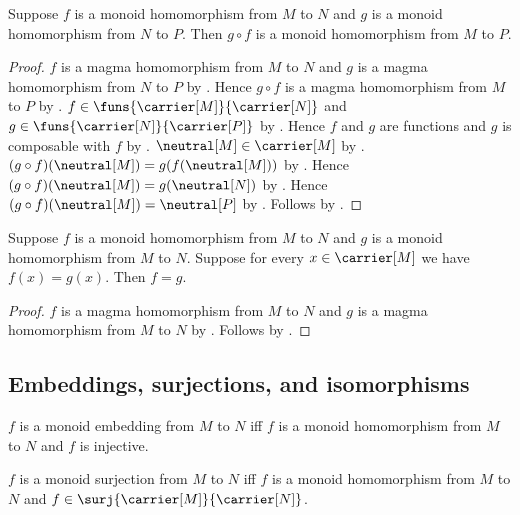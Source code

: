 \begin{theorem}\label{monoid_hom_composition}
    Suppose $f$ is a monoid homomorphism from $M$ to $N$ and
        $g$ is a monoid homomorphism from $N$ to $P$.
    Then $g\circ f$ is a monoid homomorphism from $M$ to $P$.
\end{theorem}
\begin{proof}
    $f$ is a magma homomorphism from $M$ to $N$ and
        $g$ is a magma homomorphism from $N$ to $P$ by
        .
    Hence $g\circ f$ is a magma homomorphism from $M$ to $P$ by
        .
    $f\in\funs{\carrier[M]}{\carrier[N]}$ and
        $g\in\funs{\carrier[N]}{\carrier[P]}$ by
        .
    Hence $f$ and $g$ are functions and $g$ is composable with $f$ by
        .
    $\neutral[M]\in\carrier[M]$ by
        .
    $(g\circ f)(\neutral[M])=g(f(\neutral[M]))$ by
        .
    Hence $(g\circ f)(\neutral[M])=g(\neutral[N])$ by
        .
    Hence $(g\circ f)(\neutral[M])=\neutral[P]$ by
        .
    Follows by .
\end{proof}

\begin{theorem}\label{monoid_hom_extensionality}
    Suppose $f$ is a monoid homomorphism from $M$ to $N$ and
        $g$ is a monoid homomorphism from $M$ to $N$.
    Suppose for every $x\in\carrier[M]$ we have $f(x)=g(x)$.
    Then $f=g$.
\end{theorem}
\begin{proof}
    $f$ is a magma homomorphism from $M$ to $N$ and
        $g$ is a magma homomorphism from $M$ to $N$ by
        .
    Follows by .
\end{proof}

\subsection{Embeddings, surjections, and isomorphisms}

\begin{definition}\label{monoid_embedding}
    $f$ is a monoid embedding from $M$ to $N$ iff
        $f$ is a monoid homomorphism from $M$ to $N$ and
        $f$ is injective.
\end{definition}

\begin{definition}\label{monoid_surjection}
    $f$ is a monoid surjection from $M$ to $N$ iff
        $f$ is a monoid homomorphism from $M$ to $N$ and
        $f\in\surj{\carrier[M]}{\carrier[N]}$.
\end{definition}

